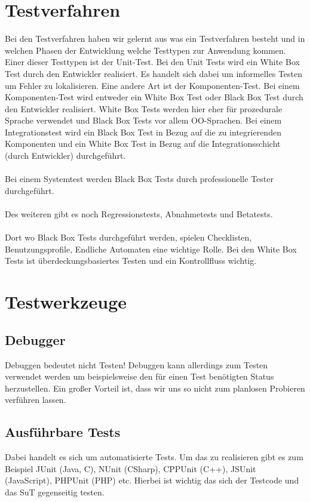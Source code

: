 \section{Testverfahren}
Bei den Testverfahren haben wir gelernt aus was ein Testverfahren besteht und in welchen Phasen der Entwicklung welche Testtypen zur Anwendung kommen.
Einer dieser Testtypen ist der Unit-Test.
Bei den Unit Tests wird ein White Box Test durch den Entwickler realisiert. Es handelt sich dabei um informelles Testen um Fehler zu lokalisieren. 
Eine andere Art ist der Komponenten-Test.
Bei einem Komponenten-Test wird entweder ein White Box Test oder Black Box Test durch den Entwickler realisiert. White Box Tests werden hier eher für prozedurale Sprache verwendet und Black Box Tests vor allem OO-Sprachen.
Bei einem Integrationstest wird ein Black Box Test in Bezug auf die zu integrierenden Komponenten und ein White Box Test in Bezug auf die Integrationsschicht (durch Entwickler) durchgeführt. 
\\\\
Bei einem Systemtest werden Black Box Tests durch professionelle Tester durchgeführt.
\\\\
Des weiteren gibt es noch Regressionstests, Abnahmetests und Betatests. 
\\\\
Dort wo Black Box Tests durchgeführt werden, spielen Checklisten, Benutzungsprofile, Endliche Automaten eine wichtige Rolle. Bei den White Box Tests ist überdeckungsbasiertes Testen und ein Kontrollfluss wichtig. 

\section{Testwerkzeuge}
\subsection{Debugger}
Debuggen bedeutet nicht Testen! Debuggen kann allerdings zum Testen verwendet werden um beispielsweise den für einen Test benötigten Status herzustellen. Ein großer Vorteil ist, dass wir uns so nicht zum planlosen Probieren verführen lassen.

\subsection{Ausführbare Tests}
Dabei handelt es sich um automatisierte Tests. Um das zu realisieren gibt es zum Beispiel JUnit (Java, C), NUnit (CSharp), CPPUnit (C++), JSUnit (JavaScript), PHPUnit (PHP) etc.
Hierbei ist wichtig das sich der Testcode und das SuT gegenseitig testen.
 
